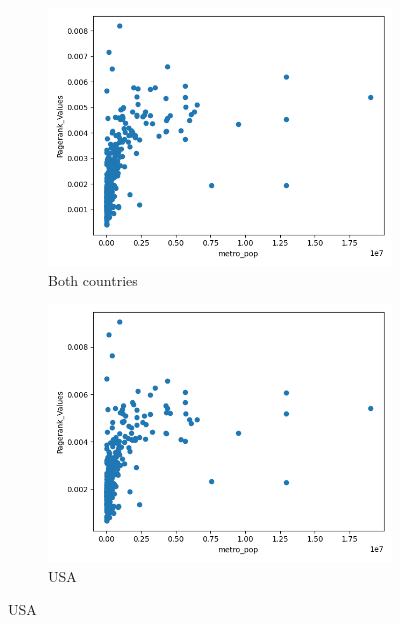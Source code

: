 \begin{figure}[H]
     \centering
     \begin{subfigure}[b]{0.3\textwidth}
         \centering
         \includegraphics[width=\textwidth]{images/comparison/ALL/relationship_metro_pop_vs_Pagerank_Values_ALL.png}
         \caption{Both countries}
         \label{fig:metro-page-both}
     \end{subfigure}
     \hfill
     \begin{subfigure}[b]{0.3\textwidth}
         \centering
         \includegraphics[width=\textwidth]{images/comparison/USA/relationship_metro_pop_vs_Pagerank_Values_USA.png}
         \caption{USA}
         \label{fig:metro-page-usa}
     \end{subfigure}

\end{figure}
